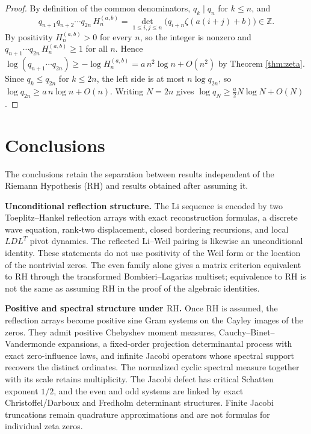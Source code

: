 \documentclass[preprint,12pt]{elsarticle}
\numberwithin{equation}{section}
\theoremstyle{plain}
\theoremstyle{definition}
\theoremstyle{remark}
\newcommand{\RH}{\mathrm{RH}}
\begin{document}
\begin{proof}
By definition of the common denominators, \(q_k\mid q_n\) for \(k\le n\), and
\[
q_{n+1}q_{n+2}\cdots q_{2n}\,H_{n}^{(a,b)}=\det_{1\le i,j\le n}\bigl(q_{i+n}\zeta(a(i+j)+b)\bigr)\in\mathbb Z .
\]
By positivity $H_{n}^{(a,b)}>0$ for every $n$, so the integer is nonzero and
$q_{n+1}\cdots q_{2n}\,H_{n}^{(a,b)}\ge1$ for all $n$. Hence
$\log(q_{n+1}\cdots q_{2n})\ge-\log H_{n}^{(a,b)}=a\,n^{2}\log n+O(n^{2})$ by Theorem \ref{thm:zeta}.
Since $q_{k}\le q_{2n}$ for $k\le2n$, the left side is at most $n\log q_{2n}$, so
$\log q_{2n}\ge a\,n\log n+O(n)$. Writing $N=2n$ gives
$\log q_{N}\ge\tfrac a2N\log N+O(N)$.
\end{proof}


\section{Conclusions}
The conclusions retain the separation between results independent of the Riemann Hypothesis
(\(\RH\)) and results obtained after assuming it.

\medskip
\noindent\textbf{Unconditional reflection structure.}
The Li sequence is encoded by two Toeplitz--Hankel reflection arrays with exact reconstruction
formulas, a discrete wave equation, rank-two displacement, closed bordering recursions, and local
\(LDL^T\) pivot dynamics.  The reflected Li--Weil pairing is likewise an unconditional identity.
These statements do not use positivity of the Weil form or the location of the nontrivial zeros.
The even family alone gives a matrix criterion equivalent to \(\RH\) through the transformed
Bombieri--Lagarias multiset; equivalence to \(\RH\) is not the same as assuming \(\RH\) in the
proof of the algebraic identities.

\medskip
\noindent\textbf{Positive and spectral structure under \(\RH\).}
Once \(\RH\) is assumed, the reflection arrays become positive sine Gram systems on the Cayley
images of the zeros.  They admit positive Chebyshev moment measures,
Cauchy--Binet--Vandermonde expansions, a fixed-order projection determinantal process with exact
zero-influence laws, and infinite Jacobi operators whose spectral support recovers the distinct
ordinates.  The normalized cyclic spectral measure together with its scale retains multiplicity.
The Jacobi defect has critical Schatten exponent \(1/2\), and the even and odd systems are linked
by exact Christoffel/Darboux and Fredholm determinant structures.  Finite Jacobi truncations remain
quadrature approximations and are not formulas for individual zeta zeros.
\end{document}
